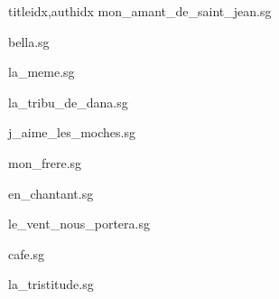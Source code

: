 \documentclass[
    fontsize=7pt
    ]{scrartcl}
\begin{document}
\begin{songs}{titleidx,authidx}
{mon_amant_de_saint_jean.sg}


{bella.sg}


{la_meme.sg}


{la_tribu_de_dana.sg}


{j_aime_les_moches.sg}


{mon_frere.sg}


{en_chantant.sg}


{le_vent_nous_portera.sg}


{cafe.sg}


{la_tristitude.sg}


\end{songs}
\end{document}
